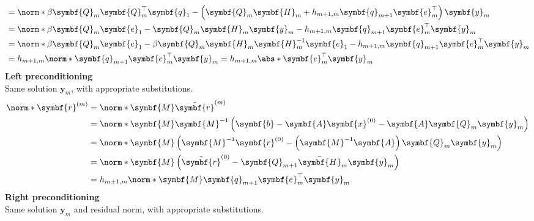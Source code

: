\documentclass{article}
\begin{document}
\begin{multicols}{2}
\begin{align*}
                                             & = \norm*{\beta \symbf{Q}_m \symbf{Q}_m^\top \symbf{q}_1 - \left( \symbf{Q}_m \symbf{H}_m + h_{m+1,m} \symbf{q}_{m+1} \symbf{e}_m^\top \right) \symbf{y}_m}    \\
                                             & = \norm*{\beta \symbf{Q}_m \symbf{e}_1 - \symbf{Q}_m \symbf{H}_m \symbf{y}_m - h_{m+1,m} \symbf{q}_{m+1} \symbf{e}_m^\top \symbf{y}_m}                        \\
                                             & = \norm*{\beta \symbf{Q}_m \symbf{e}_1 - \beta \symbf{Q}_m \symbf{H}_m \symbf{H}_m^{-1} \symbf{e}_1 - h_{m+1,m} \symbf{q}_{m+1} \symbf{e}_m^\top \symbf{y}_m} \\
                                             & = h_{m+1,m} \norm*{\symbf{q}_{m+1} \symbf{e}_m^\top \symbf{y}_m} = h_{m+1,m} \abs*{\symbf{e}_m^\top \symbf{y}_m}
    \end{align*}
    \textbf{Left preconditioning} \\
    Same solution \(\symbf{y}_m\), with appropriate substitutions.
    \begin{align*}
        \norm*{\symbf{r}^{\left( m \right)}} & = \norm*{\symbf{M} \tilde{\symbf{r}}^{\left( m \right)}}                                                                                                                               \\
                                             & = \norm*{\symbf{M} \symbf{M}^{-1} \left( \symbf{b} - \symbf{A} \symbf{x}^{\left( 0 \right)} - \symbf{A} \symbf{Q}_m \symbf{y}_m \right)}                                               \\
                                             & = \norm*{\symbf{M} \left( \symbf{M}^{-1} \symbf{r}^{\left( 0 \right)} - \left( \symbf{M}^{-1} \symbf{A} \right) \symbf{Q}_m \symbf{y}_m \right)}                                       \\
                                             & = \norm*{\symbf{M} \left( \tilde{\symbf{r}}^{\left( 0 \right)} - \symbf{Q}_{m+1} \bar{\symbf{H}}_m \symbf{y}_m \right)}                                                                \\
                                             & = h_{m+1,m} \norm*{\symbf{M} \symbf{q}_{m+1} \symbf{e}_m^\top \symbf{y}_m}
    \end{align*}
    \textbf{Right preconditioning} \\
    Same solution \(\symbf{y}_m\) and residual norm, with appropriate
    substitutions.
    \columnbreak

\end{multicols}
\end{document}
